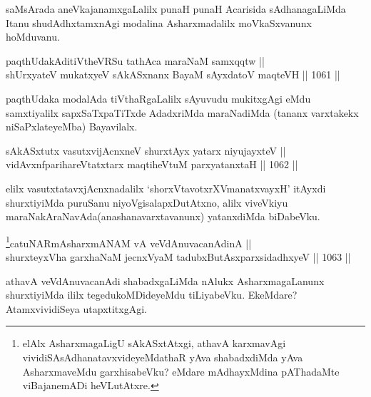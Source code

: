 \begin{artha}
saMsArada aneVkajanamxgaLalilx punaH punaH Acarisida sAdhanagaLiMda Itanu shudAdhxtamxnAgi modalina Asharxmadalilx moVkaSxvanunx hoMduvanu.
\end{artha}


\begin{shl}
paqthUdakAditiVtheVRSu tathAca maraNaM samxqqtw || \\
shUrxyateV mukatxyeV sAkASxnanx BayaM sAyxdatoV maqteVH \hfill || 1061 ||  
\end{shl}

\begin{artha}
paqthUdaka modalAda tiVthaRgaLalilx sAyuvudu mukitxgAgi eMdu samxtiyalilx sapxSaTxpaTiTxde AdadxriMda maraNadiMda (tananx varxtakekx niSaPxlateyeMba) Bayavilalx.
\end{artha}

\begin{shl}
sAkASxtutx vasutxvijAcnxneV shurxtAyx yatarx niyujayxteV || \\
vidAvxnfparihareVtatxtarx maqtiheVtuM parxyatanxtaH \hfill || 1062 ||  
\end{shl}

\begin{artha}
elilx vasutxtatavxjAcnxnadalilx `shorxVtavotxrXVmanatxvayxH' itAyxdi shurxtiyiMda puruSanu niyoVgisalapxDutAtxno, alilx viveVkiyu maraNakAraNavAda(anashanavarxtavanunx) yatanxdiMda biDabeVku.
\end{artha}


\begin{shl}
\footnote{elAlx AsharxmagaLigU sAkASxtAtxgi, athavA karxmavAgi vividiSAsAdhanatavxvideyeMdathaR yAva shabadxdiMda yAva AsharxmaveMdu garxhisabeVku? eMdare mAdhayxMdina pAThadaMte viBajanemADi heVLutAtxre.}catuNARmAsharxmANAM vA veVdAnuvacanAdinA || \\
shurxteyxVha garxhaNaM jecnxVyaM tadubxButAsxparxsidadhxyeV \hfill || 1063 ||  
\end{shl}

\begin{artha}
athavA veVdAnuvacanAdi shabadxgaLiMda nAlukx AsharxmagaLanunx shurxtiyiMda ililx tegedukoMDideyeMdu tiLiyabeVku. EkeMdare? AtamxvividiSeya utapxtitxgAgi.
\end{artha}

